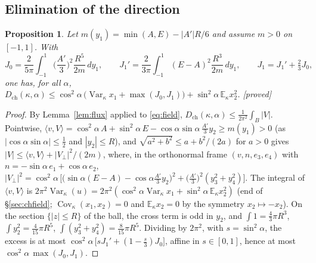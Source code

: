 \documentclass[11pt,a4paper]{article}
\newtheorem{proposition}[theorem]{Proposition}
\theoremstyle{remark}
\theoremstyle{definition}
\theoremstyle{plain}
\theoremstyle{remark}
\newcommand{\E}{\mathbb{E}}
\newcommand{\Cov}{\operatorname{Cov}}
\newcommand{\Var}{\operatorname{Var}}
\newcommand{\st}[1]{\textsf{[#1]}}
\newcommand{\Dch}{D_{\mathrm{ch}}}
\begin{document}
\subsection{Elimination of the direction}\label{sec:chalpha}

\begin{proposition}\label{prop:alpha}
Let $m(y_1)=\min(A,E)-|A'|R/6$ and assume $m>0$ on $[-1,1]$. With
\[
J_0=\frac{2}{5\pi}\int_{-1}^1\Big(\frac{A'}{3}\Big)^2\frac{R^5}{2m}\,dy_1,\qquad
J_1'=\frac{2}{3\pi}\int_{-1}^1(E-A)^2\frac{R^3}{2m}\,dy_1,\qquad J_1=J_1'+\tfrac23J_0,
\]
one has, for all $\alpha$,
$\Dch(\kappa,\alpha)\le\cos^2\alpha\,\big(\Var_\kappa x_1+\max(J_0,J_1)\big)+\sin^2\alpha\,\E_\kappa x_2^2$.
\st{proved}
\end{proposition}
\begin{proof}
By Lemma~\ref{lem:flux} applied to \eqref{eq:field}, $\Dch(\kappa,\alpha)\le\frac1{2\pi^2}\int_B|V|$.
Pointwise, $\langle v,V\rangle=\cos^2\!\alpha\,A+\sin^2\!\alpha\,E-\cos\alpha\sin\alpha\,\frac{A'}3y_2\ge m(y_1)>0$ (as
$|\cos\alpha\sin\alpha|\le\frac12$ and $|y_2|\le R$), and $\sqrt{a^2+b^2}\le a+b^2/(2a)$ for $a>0$ gives
$|V|\le\langle v,V\rangle+|V_\perp|^2/(2m)$, where, in the orthonormal frame $(v,n,e_3,e_4)$ with
$n=-\sin\alpha\,e_1+\cos\alpha\,e_2$,
$|V_\perp|^2=\cos^2\!\alpha\,\big[\big(\sin\alpha(E-A)-\cos\alpha\frac{A'}3y_2\big)^2+\big(\frac{A'}3\big)^2(y_3^2+y_4^2)\big]$.
The integral of $\langle v,V\rangle$ is $2\pi^2\Var_\kappa(u)=2\pi^2(\cos^2\!\alpha\Var_\kappa x_1+\sin^2\!\alpha\,\E_\kappa x_2^2)$
(end of \S\ref{sec:chfield}; $\Cov_\kappa(x_1,x_2)=0$ and $\E_\kappa x_2=0$ by the symmetry $x_2\mapsto-x_2$).
On the section $\{|z|\le R\}$ of the ball, the cross term is odd in $y_2$, and $\int1=\frac43\pi R^3$,
$\int y_2^2=\frac4{15}\pi R^5$, $\int(y_3^2+y_4^2)=\frac8{15}\pi R^5$. Dividing by $2\pi^2$, with $s=\sin^2\alpha$,
the excess is at most $\cos^2\!\alpha\,\big[sJ_1'+(1-\frac s3)J_0\big]$, affine in $s\in[0,1]$, hence at most
$\cos^2\!\alpha\,\max(J_0,J_1)$.
\end{proof}
\end{document}
